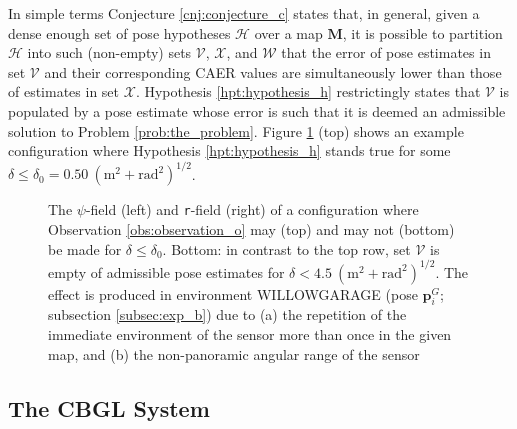 In simple terms Conjecture \ref{cnj:conjecture_c} states that, in general,
given a dense enough set of pose hypotheses $\mathcal{H}$ over a map $\bm{M}$,
it is possible to partition $\mathcal{H}$ into such (non-empty) sets
$\mathcal{V}$, $\mathcal{X}$, and $\mathcal{W}$ that the error of pose
estimates in set $\mathcal{V}$ and their corresponding CAER values are
simultaneously lower than those of estimates in set $\mathcal{X}$. Hypothesis
\ref{hpt:hypothesis_h} restrictingly states that $\mathcal{V}$ is populated by
a pose estimate whose error is such that it is deemed an admissible solution to
Problem \ref{prob:the_problem}. Figure \ref{fig:h_and_h_not_fig} (top) shows
an example configuration where Hypothesis \ref{hpt:hypothesis_h}
stands true for some $ \delta \leq \delta_0 = 0.50 \ (\text{m}^2 + \text{rad}^2)^{1/2}$.

\begin{figure}\vspace{-0.2cm}
  
  \vspace{0.5cm}
  \caption{\small The $\psi$-field (left) and \texttt{r}-field (right) of a
           configuration where Observation \ref{obs:observation_o} may (top)
           and may not (bottom) be made for $\delta \leq \delta_0$. Bottom:
           in contrast to the top row, set $\mathcal{V}$ is empty of admissible
           pose estimates for $\delta < 4.5 \ (\text{m}^2 +
           \text{rad}^2)^{1/2}$. The effect is produced in environment
           WILLOWGARAGE (pose $\bm{p}_{i}^G$; subsection \ref{subsec:exp_b})
           due to (a) the repetition of the immediate environment of the sensor
           more than once in the given map, and (b) the non-panoramic angular
           range of the sensor}
  \vspace{-0.5cm}
  \label{fig:h_and_h_not_fig}
\end{figure}


\subsection{The CBGL System}

